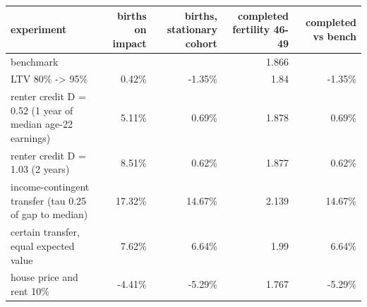 \begin{tabular}{lrrrr}
\toprule
experiment & births on impact & births, stationary cohort & completed fertility 46-49 & completed vs bench \\
\midrule
benchmark &  &  & 1.866 &  \\
LTV 80\% -> 95\% & 0.42\% & -1.35\% & 1.84 & -1.35\% \\
renter credit D = 0.52 (1 year of median age-22 earnings) & 5.11\% & 0.69\% & 1.878 & 0.69\% \\
renter credit D = 1.03 (2 years) & 8.51\% & 0.62\% & 1.877 & 0.62\% \\
income-contingent transfer (tau 0.25 of gap to median) & 17.32\% & 14.67\% & 2.139 & 14.67\% \\
certain transfer, equal expected value & 7.62\% & 6.64\% & 1.99 & 6.64\% \\
house price and rent 10\% & -4.41\% & -5.29\% & 1.767 & -5.29\% \\
\bottomrule
\end{tabular}
